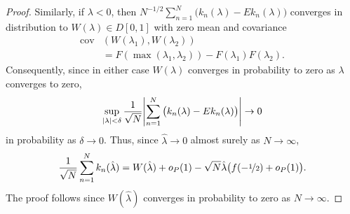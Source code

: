 \documentclass[journal]{IEEEtran}
\begin{document}
\begin{proof}
Similarly, if $\lambda < 0$, then $N^{-1/2} \sum_{n=1}^{N} \big( k_n(\lambda) - Ek_n(\lambda) \big)$ converges in distribution to $W(\lambda) \in D[0,1]$ with zero mean and covariance
\begin{align*}
\operatorname{cov}&( W(\lambda_1), W(\lambda_2) ) \\
&= F( \max(\lambda_1, \lambda_2) ) - F(\lambda_1) F(\lambda_2).
\end{align*}
Consequently, since in either case $W(\lambda)$ converges in probability to zero as $\lambda$ converges to zero,
\[
\sup_{{\left| \lambda \right|} < \delta} \frac{1}{\sqrt{N}}{\left|  \sum_{n=1}^{N} \big( k_n(\lambda) - Ek_n(\lambda) \big)   \right|} \rightarrow 0
\]
in probability as $\delta \rightarrow 0$. Thus, since $\hat{\lambda} \rightarrow 0$ almost surely as $N\rightarrow\infty$,
\[
\frac{1}{\sqrt{N}}\sum_{n=1}^{N} k_n(\hat{\lambda}) = W(\hat{\lambda}) + o_P(1) - \sqrt{N}\hat{\lambda}\big( f(-\nicefrac{1}{2}) + o_P(1) \big).
\]
The proof follows since $W(\hat{\lambda})$ converges in probability to zero as $N\rightarrow\infty$.
\end{proof}


\end{document}
